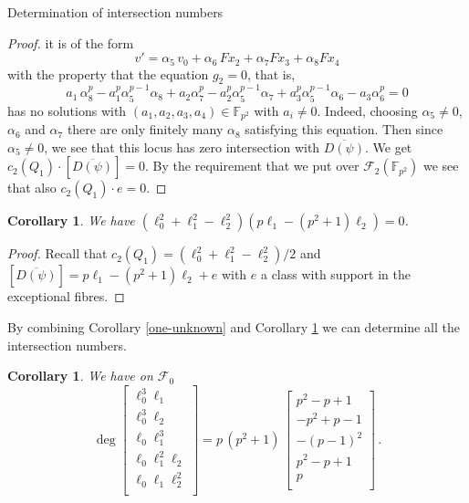 \documentclass[11pt]{amsart}
\numberwithin{equation}{section}
\newcommand{\FF}{\mathbb F}
\newtheorem{corollary}[theorem]{Corollary}
\theoremstyle{definition}
\theoremstyle{remark}
\begin{document}
\begin{section}{Determination of intersection numbers}
\begin{proof}
it is of the form
$$
v'=\alpha_5\, v_0+ \alpha_6 \, Fx_2+ \alpha_7 Fx_3+ \alpha_8 Fx_4
$$
with the property that the equation $g_2=0$, that is,
$$
a_1 \, \alpha_8^p-a_1^p\alpha_5^{p-1}\alpha_8 + a_2 \alpha_7^p-a_2^p \alpha_5^{p-1}\alpha_7
+a_3^p\alpha_5^{p-1}\alpha_6-a_3\alpha_6^p=0
$$
has no solutions with $(a_1,a_2,a_3,a_4)\in {\FF}_{p^2}$ with $a_i\neq 0$. Indeed, choosing
$\alpha_5 \neq 0$, $\alpha_6$ and $\alpha_7$ there are only finitely many $\alpha_8$ satisfying
this equation. Then since $\alpha_5\neq 0$,
 we see that this locus has zero intersection with
$\overline{D(\psi)}$. We get $c_2(Q_1)\cdot [\overline{D(\psi)}]=0$. 
By the requirement that we
put over $\mathcal{F}_2({\FF}_{p^2})$ we see that also $c_2(Q_1)\cdot e=0$.
\end{proof}
\begin{corollary}\label{final-stone}
We have $(\ell_0^2+\ell_1^2-\ell_2^2)(p\ell_1-(p^2+1)\ell_2)=0$.
\end{corollary}
\begin{proof}
Recall that  $c_2(Q_1)=(\ell_0^2+\ell_1^2-\ell_2^2)/2$ and
$[\overline{D(\psi)}]=p\ell_1-(p^2+1)\ell_2+e$
with $e$ a class with support in the exceptional fibres.
\end{proof}
By combining Corollary \ref{one-unknown} and Corollary 
\ref{final-stone} we can determine all the intersection numbers.
\begin{corollary}\label{intersection-numbers} We have on $\mathcal{F}_0$
$$
\deg \left[ 
\begin{matrix} \ell_0^3\ell_1\\ \ell_0^3\ell_2\\ \ell_0\ell_1^3\\ \ell_0\ell_1^2\ell_2\\ \ell_0\ell_1\ell_2^2 \\
\end{matrix} \right] =
p\, (p^2+1) \,  \left[ 
\begin{matrix}
p^2-p+1\\ -p^2+p-1\\
-(p-1)^2\\ p^2-p+1 \\ p \\
\end{matrix} \right] \, .
$$
\end{corollary}


\end{section}
\end{document}
